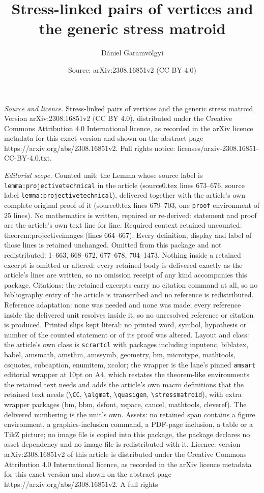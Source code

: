 \documentclass[10pt,a4paper]{amsart}
\title[Stress-linked pairs of vertices and the generic stress matro]{Stress-linked pairs of vertices and the generic stress matroid}
\author{D\'aniel Garamv\"olgyi}
\date{Source: arXiv:2308.16851v2 (CC BY 4.0)}
\begin{document}
\maketitle

\noindent\emph{Source and licence.} Stress-linked pairs of vertices and the generic stress matroid. Version arXiv:2308.16851v2 (CC BY 4.0), distributed under the Creative Commons Attribution 4.0 International licence, as recorded in the arXiv licence metadata for this exact version and shown on the abstract page https://arxiv.org/abs/2308.16851v2. Full rights notice: licenses/arxiv-2308.16851-CC-BY-4.0.txt.\par\smallskip

\noindent\textit{Editorial scope.} Counted unit: the Lemma whose source label is \texttt{lemma:projectivetechnical} in the article (source0.tex lines 673--676, source label \texttt{lemma:projectivetechnical}), delivered together with the article's own complete original proof of it (source0.tex lines 679--703, one \texttt{proof} environment of 25 lines). No mathematics is written, repaired or re-derived: statement and proof are the article's own text line for line. Required context retained uncounted: theorem:projectiveimages (lines 664--667). Every definition, display and label of those lines is retained unchanged. Omitted from this package and not redistributed: 1--663, 668--672, 677--678, 704--1473. Nothing inside a retained excerpt is omitted or altered: every retained body is delivered exactly as the article's lines are written, so no omission receipt of any kind accompanies this package. Citations: the retained excerpts carry no citation command at all, so no bibliography entry of the article is transcribed and no reference is redistributed. Reference adaptation: none was needed and none was made; every reference inside the delivered unit resolves inside it, so no unresolved reference or citation is produced. Printed slips kept literal: no printed word, symbol, hypothesis or number of the counted statement or of its proof was altered. Layout and class: the article's own class is \texttt{scrartcl} with packages including inputenc, biblatex, babel, amsmath, amsthm, amssymb, geometry, bm, microtype, mathtools, csquotes, subcaption, enumitem, xcolor; the wrapper is the lane's pinned \texttt{amsart} editorial wrapper at 10pt on A4, which restates the theorem-like environments the retained text needs and adds the article's own macro definitions that the retained text needs (\texttt{\textbackslash CC}, \texttt{\textbackslash algmat}, \texttt{\textbackslash quasigen}, \texttt{\textbackslash stressmatroid}), with extra wrapper packages (bm, bbm, dsfont, xspace, cancel, mathtools, cleveref). The delivered numbering is the unit's own. Assets: no retained span contains a figure environment, a graphics-inclusion command, a PDF-page inclusion, a table or a TikZ picture; no image file is copied into this package, the package declares no asset dependency and no image file is redistributed with it. Licence: version arXiv:2308.16851v2 of this article is distributed under the Creative Commons Attribution 4.0 International licence, as recorded in the arXiv licence metadata for this exact version and shown on the abstract page https://arxiv.org/abs/2308.16851v2. A full rights 
\end{document}
